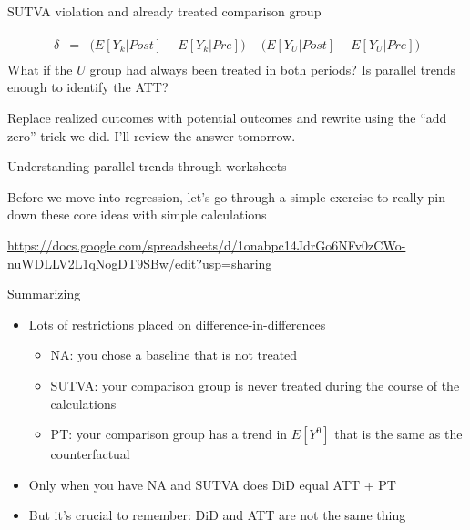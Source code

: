 \documentclass{beamer}
\begin{document}
\begin{frame}{SUTVA violation and already treated comparison group}


\begin{eqnarray*}
\widehat{\delta} &=& \bigg ( E[Y_k|Post] - E[Y_k|Pre] \bigg ) - \bigg ( E[Y_U | Post ] - E[ Y_U | Pre] \bigg) \\
\end{eqnarray*}What if the $U$ group had always been treated in both periods? Is parallel trends enough to identify the ATT?

\bigskip

Replace realized outcomes with potential outcomes and rewrite using the ``add zero'' trick we did.  I'll review the answer tomorrow.


\end{frame}











\begin{frame}{Understanding parallel trends through worksheets}

Before we move into regression, let's go through a simple exercise to really pin down these core ideas with simple calculations

\bigskip 

\url{https://docs.google.com/spreadsheets/d/1onabpc14JdrGo6NFv0zCWo-nuWDLLV2L1qNogDT9SBw/edit?usp=sharing}

\end{frame}



\begin{frame}{Summarizing}

\begin{itemize}

\item Lots of restrictions placed on difference-in-differences
	\begin{itemize}
	\item NA: you chose a baseline that is not treated
	\item SUTVA: your comparison group is never treated during the course of the calculations
	\item PT: your comparison group has a trend in $E[Y^0]$ that is the same as the counterfactual 
	\end{itemize}
\item Only when you have NA and SUTVA does DiD equal ATT + PT
\item But it's crucial to remember: DiD and ATT are not the same thing

\end{itemize}

\end{frame}
\end{document}
